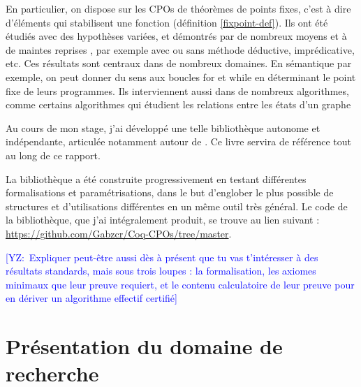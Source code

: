 \documentclass{article}
\newcommand{\yz}[1]{\textcolor{blue}{{[YZ:~#1]}}}
\theoremstyle{definition}
\begin{document}
En particulier, on dispose sur les CPOs de théorèmes de points fixes, c'est à dire d'éléments qui stabilisent une fonction (définition \ref{fixpoint-def}). Ils ont été étudiés avec des hypothèses variées, et démontrés par de nombreux moyens et à de maintes reprises \cite{main} \cite{proofs} \cite{ktnote}, par exemple avec ou sans méthode déductive, imprédicative, etc. Ces résultats sont centraux dans de nombreux domaines. En sémantique par exemple, on peut donner du sens aux boucles for et while en déterminant le point fixe de leurs programmes. Ils interviennent aussi dans de nombreux algorithmes, comme certains algorithmes qui étudient les relations entre les états d'un graphe



Au cours de mon stage, j'ai développé une telle bibliothèque autonome et indépendante, articulée notamment autour de \cite[chapitre 8]{main}. Ce livre servira de référence tout au long de ce rapport.

La bibliothèque a été construite progressivement en testant différentes formalisations et paramétrisations, dans le but d'englober le plus possible de structures et d'utilisations différentes en un même outil très général. Le code de la bibliothèque, que j'ai intégralement produit, se trouve au lien suivant \cite{code}: \href{https://github.com/Gabzcr/Coq-CPOs/tree/master}{https://github.com/Gabzcr/Coq-CPOs/tree/master}.


\yz{Expliquer peut-être aussi dès à présent que tu vas t'intéresser à des résultats standards,
mais sous trois loupes : la formalisation, les axiomes minimaux que leur preuve
requiert, et le contenu calculatoire de leur preuve pour en dériver un
algorithme effectif certifié}

{
  \hypersetup{linkcolor=black}
  \tableofcontents
}

\section{Présentation du domaine de recherche}
\end{document}
